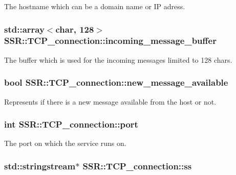 The hostname which can be a domain name or I\-P adress. \hypertarget{classSSR_1_1TCP__connection_ac056f76e1f68c1d55c24c54da85b86f2}{
\subsubsection[{incoming\-\_\-message\-\_\-buffer}]{\setlength{\rightskip}{0pt plus 5cm}std\-::array$<$char, 128$>$ S\-S\-R\-::\-T\-C\-P\-\_\-connection\-::incoming\-\_\-message\-\_\-buffer\hspace{0.3cm}{\ttfamily [private]}}}\label{classSSR_1_1TCP__connection_ac056f76e1f68c1d55c24c54da85b86f2}
The buffer which is used for the incoming messages limited to 128 chars. \hypertarget{classSSR_1_1TCP__connection_a5a9548fef4138d6cc2a71122ba115ec9}{
\subsubsection[{new\-\_\-message\-\_\-available}]{\setlength{\rightskip}{0pt plus 5cm}bool S\-S\-R\-::\-T\-C\-P\-\_\-connection\-::new\-\_\-message\-\_\-available\hspace{0.3cm}{\ttfamily [private]}}}\label{classSSR_1_1TCP__connection_a5a9548fef4138d6cc2a71122ba115ec9}
Represents if there is a new message available from the host or not. \hypertarget{classSSR_1_1TCP__connection_a30734c753f6d788ee25211ba6180380d}{
\subsubsection[{port}]{\setlength{\rightskip}{0pt plus 5cm}int S\-S\-R\-::\-T\-C\-P\-\_\-connection\-::port\hspace{0.3cm}{\ttfamily [private]}}}\label{classSSR_1_1TCP__connection_a30734c753f6d788ee25211ba6180380d}
The port on which the service runs on. \hypertarget{classSSR_1_1TCP__connection_ae2920895ce251ebd5625a028c546ff8f}{
\subsubsection[{ss}]{\setlength{\rightskip}{0pt plus 5cm}std\-::stringstream$\ast$ S\-S\-R\-::\-T\-C\-P\-\_\-connection\-::ss\hspace{0.3cm}{\ttfamily [private]}}}\label{classSSR_1_1TCP__connection_ae2920895ce251ebd5625a028c546ff8f}
